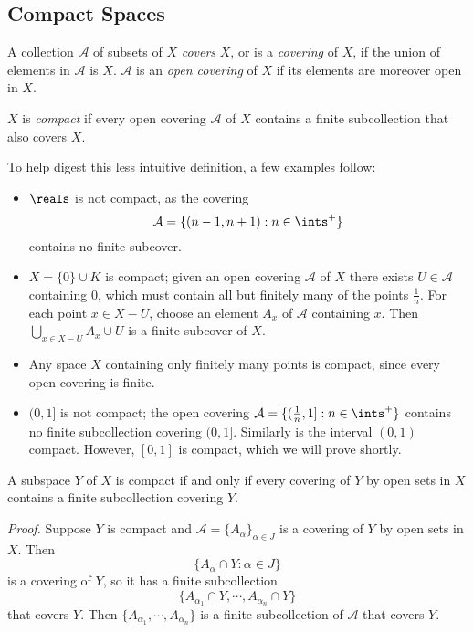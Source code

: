 \subsection{Compact Spaces}
\begin{definition}\label{3.21}
    A collection $\mathcal{A}$ of subsets of $X$ {\it covers} $X$, or is a {\it covering} of $X$, if the union of elements in $\mathcal{A}$ is $X$. $\mathcal{A}$ is an {\it open covering} of $X$ if its elements are moreover open in $X$.
\end{definition}
\begin{definition}\label{3.22}
    $X$ is {\it compact} if every open covering $\mathcal{A}$ of $X$ contains a finite subcollection that also covers $X$.
\end{definition}
To help digest this less intuitive definition, a few examples follow:
\begin{itemize}
    \item $\reals$ is not compact, as the covering
    $$\mathcal{A} = \{(n-1, n+1): n \in \ints^+\}$$
    contains no finite subcover.

    \item $X = \{0 \} \cup K$ is compact; given an open covering $\mathcal{A}$ of $X$ there exists $U \in \mathcal{A}$ containing $0$, which must contain all but finitely many of the points $\frac1n$. For each point $x\in X-U$, choose an element $A_x$ of $\mathcal{A}$ containing $x$. Then $\bigcup_{x \in X-U} A_x \cup U$ is a finite subcover of $X$.

    \item Any space $X$ containing only finitely many points is compact, since every open covering is finite.

    \item $(0, 1]$ is not compact; the open covering $\mathcal{A} = \{(\frac1n, 1]: n \in \ints^+\}$ contains no finite subcollection covering $(0, 1]$. Similarly is the interval $(0, 1)$ compact. However, $[0, 1]$ is compact, which we will prove shortly.
\end{itemize}
\begin{lemma}\label{3.23}
    A subspace $Y$ of $X$ is compact if and only if every covering of $Y$ by open sets in $X$ contains a finite subcollection covering $Y$.
\end{lemma}
{\it Proof.} Suppose $Y$ is compact and $\mathcal{A} = \{A_\alpha\}_{\alpha \in J}$ is a covering of $Y$ by open sets in $X$. Then
$$\{A_\alpha \cap Y: \alpha \in J\}$$
is a covering of $Y$, so it has a finite subcollection
$$\{A_{\alpha_1} \cap Y, \cdots, A_{\alpha_n} \cap Y\}$$
that covers $Y$. Then $\{A_{\alpha_1}, \cdots, A_{\alpha_n}\}$ is a finite subcollection of $\mathcal{A}$ that covers $Y$.

